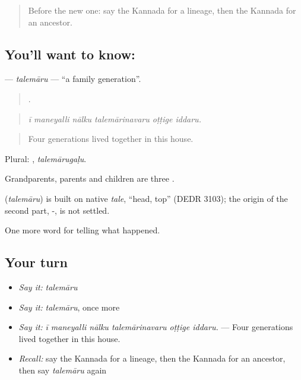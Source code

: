 \label{lesson:KA-C341-talemaru}



\begin{quote}
Before the new one: say the Kannada for a lineage, then the Kannada for an ancestor.
\end{quote}

\subsection*{You'll want to know: }
\textbf{} — \emph{talemāru} — \textquotedblleft{}a family generation\textquotedblright{}.

\begin{quote}
     .
\end{quote}

\begin{quote}
\emph{ī maneyalli nālku talemārinavaru oṭṭige iddaru.}
\end{quote}

\begin{quote}
Four generations lived together in this house.
\end{quote}

Plural: , \emph{talemārugaḷu}.

Grandparents, parents and children are three .

\begin{cousinweb}
\textbf{} (\emph{talemāru}) is built on native \emph{tale}, \textquotedblleft{}head, top\textquotedblright{} (DEDR 3103); the origin of the second part, -, is not settled.
\end{cousinweb}

\begin{grammarlens}[title={What you've built}]
One more word for telling what happened.
\end{grammarlens}

\subsection*{Your turn}
\begin{itemize}
\raggedright
  \item \emph{Say it:} \emph{talemāru}
  \item \emph{Say it:} \emph{talemāru}, once more
  \item \emph{Say it:} \emph{ī maneyalli nālku talemārinavaru oṭṭige iddaru.} — Four generations lived together in this house.
  \item \emph{Recall:} say the Kannada for a lineage, then the Kannada for an ancestor, then say \emph{talemāru} again
\end{itemize}

